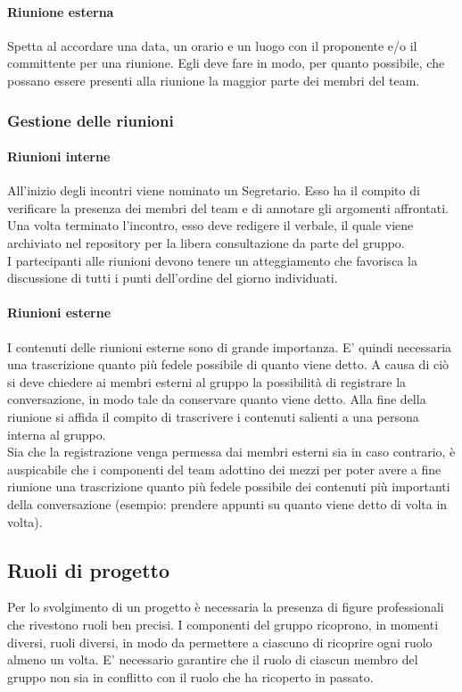 			\paragraph{Riunione esterna}
				Spetta al  accordare una data, un orario e un luogo con il proponente e/o il committente per una riunione. Egli deve fare in modo, per quanto possibile, che possano essere presenti alla riunione la maggior parte dei membri del team.
		\subsubsection{Gestione delle riunioni}
			\paragraph{Riunioni interne}
				All'inizio degli incontri viene nominato un Segretario. Esso ha il compito di verificare la presenza dei membri del team e di annotare gli argomenti affrontati. Una volta terminato l'incontro, esso deve redigere il verbale, il quale viene archiviato nel repository per la libera consultazione da parte del gruppo.\\
				I partecipanti alle riunioni devono tenere un atteggiamento che favorisca la discussione di tutti i punti dell'ordine del giorno individuati.
			\paragraph{Riunioni esterne}
				I contenuti delle riunioni esterne sono di grande importanza. E' quindi necessaria una trascrizione quanto più fedele possibile di quanto viene detto. A causa di ciò si deve chiedere ai membri esterni al gruppo la possibilità di registrare la conversazione, in modo tale da conservare quanto viene detto. Alla fine della riunione si affida il compito di trascrivere i contenuti salienti a una persona interna al gruppo.\\
				Sia che la registrazione venga permessa dai membri esterni sia in caso contrario, è auspicabile che i componenti del team adottino dei mezzi per poter avere a fine riunione una trascrizione quanto più fedele possibile dei contenuti più importanti della conversazione (esempio: prendere appunti su quanto viene detto di volta in volta).
	\subsection{Ruoli di progetto}
		Per lo svolgimento di un progetto è necessaria la presenza di figure professionali che rivestono ruoli ben precisi. I componenti del gruppo ricoprono, in momenti diversi, ruoli diversi, in modo da permettere a ciascuno di ricoprire ogni ruolo almeno un volta. E' necessario garantire che il ruolo di ciascun membro del gruppo non sia in conflitto con il ruolo che ha ricoperto in passato.
